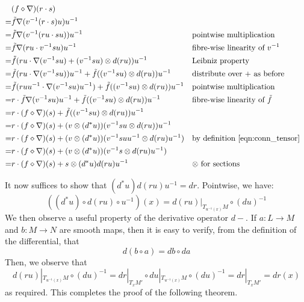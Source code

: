 \documentclass{amsart}
\newcommand{\tensor}{\otimes}
\renewcommand{\to}[1][]{\stackrel{#1}{\longrightarrow}}
\numberwithin{thm}{section}
\theoremstyle{definition}
\begin{document}
\begin{align*}
   & (f \diamond \nabla)(r \cdot s) \\
  =& \tilde{f}\nabla(v^{-1}(r \cdot s)u)u^{-1} \\
  =& \tilde{f}\nabla(v^{-1}(ru \cdot su))u^{-1}
    && \text{pointwise multiplication} \\
  =& \tilde{f}\nabla(ru \cdot v^{-1}su)u^{-1}
    && \text{fibre-wise linearity of } v^{-1} \\
  =& \tilde{f}(ru \cdot \nabla(v^{-1}su) + (v^{-1}su) \tensor d(ru))u^{-1}
    && \text{Leibniz property} \\
  =& \tilde{f}(ru \cdot \nabla(v^{-1}su))u^{-1}
      + \tilde{f}((v^{-1}su) \tensor d(ru))u^{-1}
    && \text{distribute over $+$ as before} \\
  =& \tilde{f}(ruu^{-1} \cdot \nabla(v^{-1}su)u^{-1})
      + \tilde{f}((v^{-1}su) \tensor d(ru))u^{-1}
    && \text{pointwise multiplication} \\
  =& r \cdot \tilde{f}\nabla(v^{-1}su)u^{-1}
      + \tilde{f}((v^{-1}su) \tensor d(ru))u^{-1}
    && \text{fibre-wise linearity of } \tilde{f} \\
  =& r \cdot (f \diamond \nabla)(s)
      + \tilde{f}((v^{-1}su) \tensor d(ru))u^{-1} \\
  =& r \cdot (f \diamond \nabla)(s)
      + (v \tensor (d^*u))(v^{-1}su \tensor d(ru))u^{-1} \\
  =& r \cdot (f \diamond \nabla)(s)
      + (v \tensor (d^*u))(v^{-1}suu^{-1} \tensor d(ru)u^{-1})
    && \text{by definition \eqref{eqn:conn_tensor}} \\
  =& r \cdot (f \diamond \nabla)(s)
      + (v \tensor (d^*u))(v^{-1}s \tensor d(ru)u^{-1}) \\
  =& r \cdot (f \diamond \nabla)(s)
      + s \tensor (d^*u)d(ru)u^{-1}
    && \text{$\tensor$ for sections}
\end{align*}

It now suffices to show that $(d^*u)d(ru)u^{-1} = dr$. Pointwise, we have:
\[
  ((d^*u) \circ d(ru) \circ u^{-1})(x) = d(ru)|_{T_{u^{-1}(x)}M} \circ (du)^{-1}
\]
We then observe a useful property of the derivative
operator $d-$. If $a : L \to M$ and $b : M \to N$ are smooth maps, then it is
easy to verify, from the definition of the differential, that
\[
  d(b \circ a) = db \circ da
\]
Then, we observe that
\[
  d(ru)|_{T_{u^{-1}(x)}M} \circ (du)^{-1}
  = dr|_{T_xM'} \circ du|_{T_{u^{-1}(x)}M} \circ (du)^{-1}
  = dr|_{T_xM'}
  = dr(x)
\]
as required. This completes the proof of the following theorem.
\end{document}
